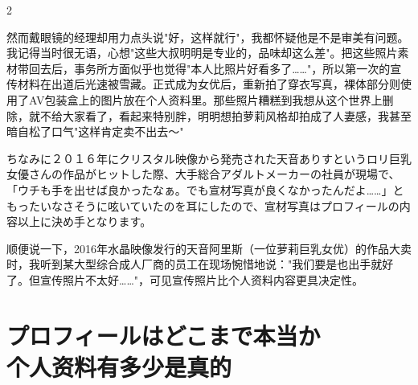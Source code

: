 \documentclass[12pt,UTF8]{ctexbook}
\begin{document}
\begin{paracol}{2}
\switchcolumn

然而戴眼镜的经理却用力点头说"好，这样就行"，我都怀疑他是不是审美有问题。我记得当时很无语，心想"这些大叔明明是专业的，品味却这么差"。把这些照片素材带回去后，事务所方面似乎也觉得"本人比照片好看多了……"，所以第一次的宣传材料在出道后光速被雪藏。正式成为女优后，重新拍了穿衣写真，裸体部分则使用了AV包装盒上的图片放在个人资料里。那些照片糟糕到我想从这个世界上删除，就不给大家看了，看起来特别胖，明明想拍萝莉风格却拍成了人妻感，我甚至暗自松了口气"这样肯定卖不出去〜"

\switchcolumn*

ちなみに２０１６年にクリスタル映像から発売された天音ありすというロリ巨乳女優さんの作品がヒットした際、大手総合アダルトメーカーの社員が現場で、「ウチも手を出せば良かったなぁ。でも宣材写真が良くなかったんだよ……」ともったいなさそうに呟いていたのを耳にしたので、宣材写真はプロフィールの内容以上に決め手となります。

\switchcolumn

顺便说一下，2016年水晶映像发行的天音阿里斯（一位萝莉巨乳女优）的作品大卖时，我听到某大型综合成人厂商的员工在现场惋惜地说："我们要是也出手就好了。但宣传照片不太好……"，可见宣传照片比个人资料内容更具决定性。

\end{paracol}

\section{プロフィールはどこまで本当か\\个人资料有多少是真的}
\end{document}
